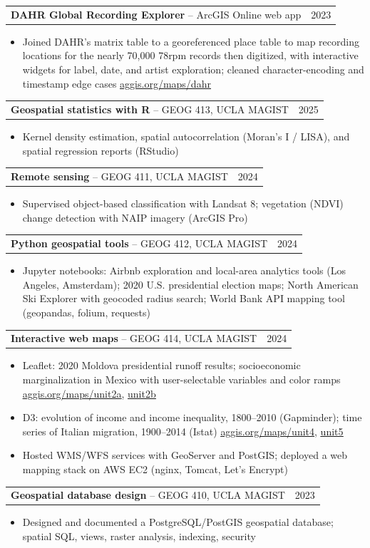 \documentclass[letterpaper,10pt]{article}
\makeatletter
\newlength{\entrygap}   \setlength{\entrygap}{1pt}   %
\newlength{\groupgap}   \setlength{\groupgap}{4pt}   %
\newlength{\bulletgap}  \setlength{\bulletgap}{0pt}  %
\newlength{\groupindent}\setlength{\groupindent}{0.15in} %
\newcommand{\resumeItem}[1]{\item \small{#1}}
\newif\ifresumecont \resumecontfalse
\newcommand{\resumeProjectHeading}[2]{%
  \vspace{\entrygap}\item
    \begin{tabular*}{0.97\textwidth}[t]{l@{\extracolsep{\fill}}r}
      \small#1 & \small#2 \\
    \end{tabular*}%
}
\newcommand{\cvGroupHeading}[1]{%
  \resumecontfalse
  \vspace{\groupgap}\item[]\hspace*{-\groupindent}{\small\bfseries\scshape #1}%
}
\newcommand{\resumeItemListStart}{%
  \begin{itemize}[leftmargin=\groupindent, itemsep=\bulletgap,
                  parsep=0pt, topsep=1pt, partopsep=0pt]}
\newcommand{\resumeItemListEnd}{\resumecontfalse\end{itemize}}
\newcommand{\lnk}[2]{{\scriptsize\href{#1}{\underline{#2}}}}
\makeatother
\begin{document}
    \resumeProjectHeading
      {\textbf{DAHR Global Recording Explorer} -- ArcGIS Online web app}{2023}
      \resumeItemListStart
        \resumeItem{Joined DAHR's matrix table to a georeferenced place table to map recording locations for the nearly 70,000 78rpm records then digitized, with interactive widgets for label, date, and artist exploration; cleaned character-encoding and timestamp edge cases \lnk{https://aggis.org/maps/dahr/}{aggis.org/maps/dahr}}
      \resumeItemListEnd


    \cvGroupHeading{Topics}

    \resumeProjectHeading
      {\textbf{Geospatial statistics with R} -- GEOG 413, UCLA MAGIST}{2025}
      \resumeItemListStart
        \resumeItem{Kernel density estimation, spatial autocorrelation (Moran's I / LISA), and spatial regression reports (RStudio)}
      \resumeItemListEnd

    \resumeProjectHeading
      {\textbf{Remote sensing} -- GEOG 411, UCLA MAGIST}{2024}
      \resumeItemListStart
        \resumeItem{Supervised object-based classification with Landsat 8; vegetation (NDVI) change detection with NAIP imagery (ArcGIS Pro)}
      \resumeItemListEnd

    \resumeProjectHeading
      {\textbf{Python geospatial tools} -- GEOG 412, UCLA MAGIST}{2024}
      \resumeItemListStart
        \resumeItem{Jupyter notebooks: Airbnb exploration and local-area analytics tools (Los Angeles, Amsterdam); 2020 U.S. presidential election maps; North American Ski Explorer with geocoded radius search; World Bank API mapping tool (geopandas, folium, requests)}
      \resumeItemListEnd

    \resumeProjectHeading
      {\textbf{Interactive web maps} -- GEOG 414, UCLA MAGIST}{2024}
      \resumeItemListStart
        \resumeItem{Leaflet: 2020 Moldova presidential runoff results; socioeconomic marginalization in Mexico with user-selectable variables and color ramps \lnk{https://aggis.org/maps/unit2a/}{aggis.org/maps/unit2a}, \lnk{https://aggis.org/maps/unit2b/}{unit2b}}
        \resumeItem{D3: evolution of income and income inequality, 1800--2010 (Gapminder); time series of Italian migration, 1900--2014 (Istat) \lnk{https://aggis.org/maps/unit4/}{aggis.org/maps/unit4}, \lnk{https://aggis.org/maps/unit5/}{unit5}}
        \resumeItem{Hosted WMS/WFS services with GeoServer and PostGIS; deployed a web mapping stack on AWS EC2 (nginx, Tomcat, Let's Encrypt)}
      \resumeItemListEnd

    \resumeProjectHeading
      {\textbf{Geospatial database design} -- GEOG 410, UCLA MAGIST}{2023}
      \resumeItemListStart
        \resumeItem{Designed and documented a PostgreSQL/PostGIS geospatial database; spatial SQL, views, raster analysis, indexing, security}
      \resumeItemListEnd
\end{document}
